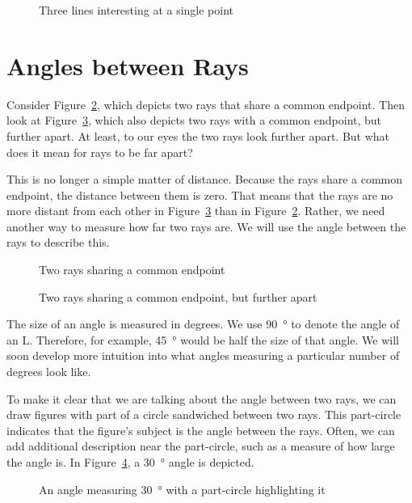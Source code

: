 \documentclass[a4paper,10pt]{report}
\begin{document}
\begin{figure}
 \fgAsterisk{}

 \caption{Three lines interesting at a single point}
 \label{an:asterisk}
\end{figure}

\section{Angles between Rays}

Consider Figure~\ref{an:tworays}, which depicts two rays that share a common
endpoint. Then look at Figure~\ref{an:tworaysfar}, which also depicts two rays
with a common endpoint, but further apart. At least, to our eyes the two rays
look further apart. But what does it mean for rays to be far apart?

This is no longer a simple matter of distance. Because the rays share a common
endpoint, the distance between them is zero. That means that the rays are no
more distant from each other in Figure~\ref{an:tworaysfar} than in
Figure~\ref{an:tworays}. Rather, we need another way to measure how far two rays
are. We will use the \gls{angle} between the rays to describe this.

\begin{figure}
 \fgTwoRays{}

 \caption{Two rays sharing a common endpoint}
 \label{an:tworays}
\end{figure}

\begin{figure}
 \fgTwoRaysFar{}

 \caption{Two rays sharing a common endpoint, but further apart}
 \label{an:tworaysfar}
\end{figure}

The size of an angle is measured in degrees. We use \SI{90}{\degree} to denote
the angle of an L. Therefore, for example, \SI{45}{\degree} would be half the
size of that angle. We will soon develop more intuition into what angles
measuring a particular number of degrees look like.

To make it clear that we are talking about the angle between two rays, we can
draw figures with part of a circle sandwiched between two rays. This part-circle
indicates that the figure's subject is the angle between the rays. Often, we can
add additional description near the part-circle, such as a measure of how large
the angle is. In Figure~\ref{an:anglethirty}, a \SI{30}{\degree} angle is
depicted.

\begin{figure}

 \caption{An angle measuring \SI{30}{\degree} with a part-circle highlighting
 it}
 \label{an:anglethirty}
\end{figure}
\end{document}
